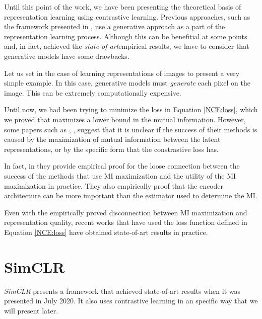 \label{Chapter:SimCLR-BYOL}
Until this point of the work, we have been presenting the theoretical basis of representation learning using contrastive learning. Previous approaches, such as  the framework presented in \cite{oord_representation_2019}, use a generative approach as a part of the representation learning process. Although this can be benefitial at some points and, in fact, achieved the \emph{state-of-art}\footnotemark empirical results, we have to consider that generative models have some drawbacks. 



Let us set in the case of learning representations of images to present a very simple example. In this case, generative models must \emph{generate} each pixel on the image. This can be extremely computationally expensive. 

Until now, we had been trying to minimize the loss in Equation \eqref{NCE:loss}, which we proved that maximizes a lower bound in the mutual information. However, some papers such as \cite{chen_simple_2020}, \cite{tschannen_mutual_2020}, suggest that it is unclear if the success of their methods is caused by the maximization of mutual information between the latent representations, or by the specific form that the constrastive loss has.

In fact, in \cite{tschannen_mutual_2020} they provide empirical proof for the loose connection between the success of the methods that use MI maximization and the utility of the MI maximization in practice. They also empirically proof  that the encoder architecture can be more important than the estimator used to determine the MI.

Even with the empirically proved disconnection between MI maximization and representation quality, recent works that have used the loss function defined in Equation \eqref{NCE:loss} have obtained state-of-art results in practice. 

\section{SimCLR}

\emph{SimCLR} \citep{chen_simple_2020} presents a framework that achieved state-of-art results when it was presented in July 2020. It also uses contrastive learning in an specific way that we will present later. 

